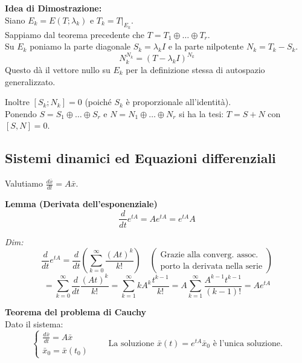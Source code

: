 \documentclass[openany]{book}
\theoremstyle{definition}
\theoremstyle{remark}
\begin{document}

\textbf{Idea di Dimostrazione:} \\
Siano $E_k = E(T; \lambda_k)$ e $T_k = T|_{E_k}$. \\
Sappiamo dal teorema precedente che $T = T_1 \oplus \dots \oplus T_r$. \\
Su $E_k$ poniamo la parte diagonale $S_k = \lambda_k I$ e la parte nilpotente $N_k = T_k - S_k$.
\begin{equation*}
    N_k^{N_k} = (T - \lambda_k I)^{N_k}
\end{equation*}
Questo dà il vettore nullo su $E_k$ per la definizione stessa di autospazio generalizzato.

Inoltre $[S_k; N_k] = 0$ (poiché $S_k$ è proporzionale all'identità). \\
Ponendo $S = S_1 \oplus \dots \oplus S_r$ e $N = N_1 \oplus \dots \oplus N_r$ si ha la tesi: $T = S + N$ con $[S, N] = 0$.

\vspace{0.5cm}
\subsection*{Sistemi dinamici ed Equazioni differenziali}
Valutiamo $\frac{d\bar{x}}{dt} = A\bar{x}$.

\textbf{Lemma (Derivata dell'esponenziale)}
\begin{equation*}
    \frac{d}{dt} e^{tA} = A e^{tA} = e^{tA} A
\end{equation*}

\textit{Dim:} 
\begin{equation*}
    \frac{d}{dt} e^{tA} = \frac{d}{dt} \left( \sum_{k=0}^{\infty} \frac{(At)^k}{k!} \right) \quad \left(\substack{\text{Grazie alla converg. assoc. } \\ \text{porto la derivata nella serie}}\right)
\end{equation*}
\begin{equation*}
    = \sum_{k=0}^{\infty} \frac{d}{dt} \frac{(At)^k}{k!} = \sum_{k=1}^{\infty} k A^k \frac{t^{k-1}}{k!} = A \sum_{k=1}^{\infty} \frac{A^{k-1} t^{k-1}}{(k-1)!} = A e^{tA}
\end{equation*}

\vspace{0.3cm}
\textbf{Teorema del problema di Cauchy} \\
Dato il sistema:
\begin{equation*}
    \begin{cases}
        \frac{d\bar{x}}{dt} = A\bar{x} \\
        \bar{x}_0 = \bar{x}(t_0)
    \end{cases}
    \qquad \text{La soluzione } \bar{x}(t) = e^{tA} \bar{x}_0 \text{ è l'unica soluzione.}
\end{equation*}
\end{document}
